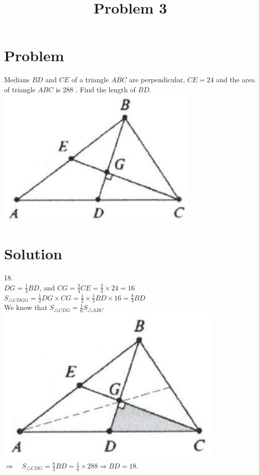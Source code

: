 \documentclass{article}
\title{Problem 3}
\date{}
\begin{document}
\maketitle

\section*{Problem}
Medians \(B D\) and \(C E\) of a triangle \(A B C\) are perpendicular, \(C E=24\) and the area of triangle \(A B C\) is 288 . Find the length of \(B D\).\\
\centering
\includegraphics[width=\textwidth]{images/problem_image_1.jpg}

\section*{Solution}
18.\\
\(D G=\frac{1}{3} B D\), and \(C G=\frac{2}{3} C E=\frac{2}{3} \times 24=16\)\\
\(S_{\triangle C D G G}=\frac{1}{2} D G \times C G=\frac{1}{2} \times \frac{1}{3} B D \times 16=\frac{8}{3} B D\)\\
We know that \(S_{\triangle C D G}=\frac{1}{6} S_{\triangle A B C}\)\\
\centering
\includegraphics[width=\textwidth]{images/reasoning_image_1.jpg}\\
\(\Rightarrow \quad S_{\triangle C D G}=\frac{8}{3} B D=\frac{1}{6} \times 288 \Rightarrow B D=18\).
\end{document}
